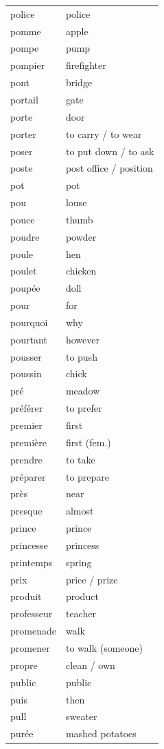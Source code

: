 \documentclass[12pt,a4paper]{article}
\begin{document}
\begin{longtable}{p{4cm} p{6cm}}
police & police \\
pomme & apple \\
pompe & pump \\
pompier & firefighter \\
pont & bridge \\
portail & gate \\
porte & door \\
porter & to carry / to wear \\
poser & to put down / to ask \\
poste & post office / position \\
pot & pot \\
pou & louse \\
pouce & thumb \\
poudre & powder \\
poule & hen \\
poulet & chicken \\
poupée & doll \\
pour & for \\
pourquoi & why \\
pourtant & however \\
pousser & to push \\
poussin & chick \\
pré & meadow \\
préférer & to prefer \\
premier & first \\
première & first (fem.) \\
prendre & to take \\
préparer & to prepare \\
près & near \\
presque & almost \\
prince & prince \\
princesse & princess \\
printemps & spring \\
prix & price / prize \\
produit & product \\
professeur & teacher \\
promenade & walk \\
promener & to walk (someone) \\
propre & clean / own \\
public & public \\
puis & then \\
pull & sweater \\
purée & mashed potatoes \\

\end{longtable}
\end{document}
